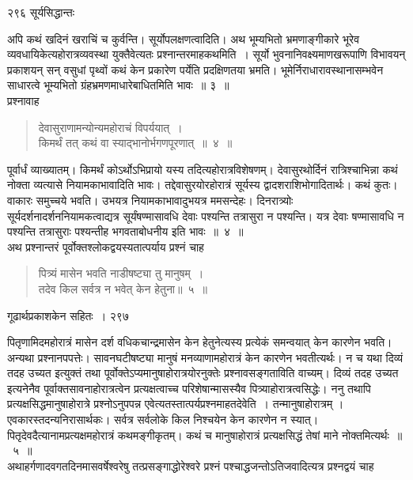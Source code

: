 \documentclass[11pt, openany]{book}
\begin{document}
\noindent २९६ \hspace{4cm} सूर्यसिद्धान्तः
\vspace{1cm}


\noindent अपि कथं खदिनं खराचिं च कुर्वन्ति। सूर्योपलक्षणत्वादिति। अथ भूम्यभितो भ्रमणाङ्गीकारे भूरेव व्यवधायिकेत्यहोरात्रव्यवस्था युक्तैवेत्यतः प्रश्नान्तरमाह\textendash कथमिति~। सूर्यो भुवनानिवक्ष्यमाणखरूपाणि विभावयन् प्रकाशयन् सन् वसुधां पृथ्वों कथं केन प्रकारेण पर्येति प्रदक्षिणतया भ्रमति। भूमेर्निराधारावस्थानासम्भवेन साधारत्वे भूम्यभितो ग्रंहभ्रमणमाधारेबाधितमिति भावः~॥ ३~॥\\
\noindent प्रश्नावाह \textendash

\begin{quote}
{\ssi देवासुराणामन्योन्यमहोराचं विपर्ययात्~।\\
किमर्थं तत् कथं वा स्याद्भानोर्भगणपूरणात्~॥~४~॥}
\end{quote}
 पूर्वार्धं व्याख्यातम्। किमर्थं कोऽर्थोऽभिप्रायो यस्य तदित्यहोरात्रविशेषणम्। देवासुरथोर्दिनं रात्रिश्चाभिन्ना कथं नोक्ता व्यत्यासे नियामकाभावादिति भावः। तद्देवासुरयोरहोरात्रं सूर्यस्य द्वादशराशिभोगादितार्थः। कथं कुतः। वाकारः समुच्चये भवति। उभयत्र नियामकाभावादुभयत्र ममसन्देहः। दिनरात्र्योः सूर्यदर्शनादर्शननियामकत्वाद्यत्र सूर्यंषण्मासावधि देवाः पश्यन्ति तत्रासुरा न पश्यन्ति। यत्र देवाः षण्मासावधि न पश्यन्ति तत्रासुराः पश्यन्तीह भगवताबोधनीय इति भावः~॥~४~॥\\
\noindent अथ प्रश्नान्तरं पूर्वोक्तश्लोकद्वयस्यतात्पर्याय प्रश्नं चाह \textendash

\begin{quote}
{\ssi पित्र्यं मासेन भवति नाडीषष्ट्या तु मानुषम्~।\\
तदेव किल सर्वत्र न भवेत् केन हेतुना॥~५~॥}
%
\end{quote}
\newpage

\hspace{3cm} गूढार्थप्रकाशकेन सहितः~। \hfill २९७
\vspace{1cm}


 पितृणामिदमहोरात्रं मासेन दर्श वधिकचान्द्रमासेन केन हेतुनेत्यस्य प्रत्येकं समन्वयात् केन कारणेन भवति। अन्यथा प्रश्नानपपत्तेः। सावनघटीषष्ट्या मानुषं मनव्याणामहोरात्रं केन कारणेन भवतीत्यर्थः। न च यथा दिव्यं तदह उच्यत इत्युक्तं तथा पूर्वोक्तेऽप्यमानुषाहोरात्रयोरनुक्तेः प्रश्नावसङ्गताविति वाच्यम्। दिव्यं तदह उच्यत इत्यनेनैव पूर्वाक्तसावनाहोरात्रत्वेन प्रत्यक्षत्वाच्च परिशेषान्मासस्यैव पित्र्याहोरात्रत्वसिद्धेः। ननु तथापि प्रत्यक्षसिद्धमानुषाहोरात्रे प्रश्नोऽनुपपन्न एवेत्यतस्तात्पर्यप्रश्नमाह\textendash तदेवेति~। तन्मानुषाहोरात्रम् । एवकारस्तदन्यनिरासार्थकः। सर्वत्र सर्वलोके किल निश्चयेन केन कारणेन न स्यात्। पितृदेवदैत्यानामप्रत्यक्षमहोरात्रं कथमङ्गीकृतम्। कथं च मानुषाहोरात्रं प्रत्यक्षसिद्धं तेषां माने नोक्तमित्यर्थः~॥~५~॥\\
 \noindent अथाहर्गणादवगतदिनमासवर्षेश्वरेषु तत्प्रसङ्गाद्धोरेश्वरे प्रश्नं पश्चाद्धजन्तोऽतिजवादित्यत्र प्रश्नद्वयं चाह\textendash
 
\end{document}
